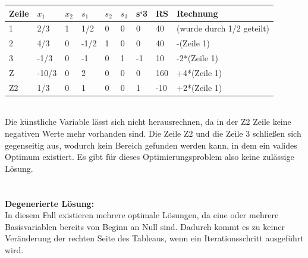 \begin{table}[!ht]
\begin{tabular}{|l|l|l|l|l|l|l|l|l|}
\hline
\rowcolor[HTML]{C0C0C0} 
Zeile                      & $x_1$                            & $x_2$                        & $s_1$                           & $s_2$                        & $s_3$                        & s`3 & RS  & Rechnung                  \\ \hline
\cellcolor[HTML]{C0C0C0}1  & \cellcolor[HTML]{FFFFFF}2/3   & \cellcolor[HTML]{FFFFFF}1 & \cellcolor[HTML]{FFFFFF}1/2  & \cellcolor[HTML]{FFFFFF}0 & \cellcolor[HTML]{FFFFFF}0 & 0   & 40  & (wurde durch 1/2 geteilt) \\ \hline
\cellcolor[HTML]{C0C0C0}2  & \cellcolor[HTML]{FFFFFF}4/3   & \cellcolor[HTML]{FFFFFF}0 & \cellcolor[HTML]{FFFFFF}-1/2 & \cellcolor[HTML]{FFFFFF}1 & \cellcolor[HTML]{FFFFFF}0 & 0   & 40  & -(Zeile 1)                \\ \hline
\cellcolor[HTML]{C0C0C0}3  & \cellcolor[HTML]{FFFFFF}-1/3  & \cellcolor[HTML]{FFFFFF}0 & \cellcolor[HTML]{FFFFFF}-1   & \cellcolor[HTML]{FFFFFF}0 & \cellcolor[HTML]{FFFFFF}1 & -1  & 10  & -2*(Zeile 1)              \\ \hline
\cellcolor[HTML]{C0C0C0}Z  & \cellcolor[HTML]{FFFFFF}-10/3 & \cellcolor[HTML]{FFFFFF}0 & \cellcolor[HTML]{FFFFFF}2    & \cellcolor[HTML]{FFFFFF}0 & \cellcolor[HTML]{FFFFFF}0 & 0   & 160 & +4*(Zeile 1)              \\ \hline
\cellcolor[HTML]{C0C0C0}Z2 & 1/3                           & 0                         & 1                            & 0                         & 0                         & 1   & -10 & +2*(Zeile 1)              \\ \hline
\end{tabular}
\end{table}
\\
Die künstliche Variable lässt sich nicht herausrechnen, da in der Z2 Zeile keine negativen Werte mehr vorhanden sind. Die Zeile Z2 und die Zeile 3 schließen sich gegenseitig aus, wodurch kein Bereich gefunden werden kann, in dem ein valides Optimum existiert. Es gibt für dieses Optimierungsproblem also keine zulässige Lösung.\\\\\\
\textbf{Degenerierte Lösung: }\\
In diesem Fall existieren mehrere optimale Lösungen, da eine oder mehrere Basisvariablen bereits von Beginn an Null sind. Dadurch kommt es zu keiner Veränderung der rechten Seite des Tableaus, wenn ein Iterationsschritt ausgeführt wird.\\\\
